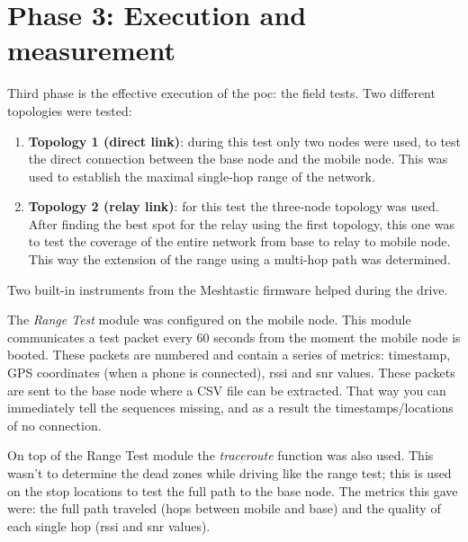\section{Phase 3: Execution and measurement}%
\label{sec:method-measurement}

Third phase is the effective execution of the \gls{poc}: the field tests.
Two different topologies were tested:
\begin{enumerate}
  \item \textbf{Topology 1 (direct link)}: during this test only two nodes were used, to test the direct connection between the base
  node and the mobile node. This was used to establish the maximal single-hop range of the network.
  \item \textbf{Topology 2 (relay link)}: for this test the three-node topology was used. After finding the best spot for the relay
  using the first topology, this one was to test the coverage of the entire network from base to relay to mobile node.
  This way the extension of the range using a multi-hop path was determined.
\end{enumerate}

Two built-in instruments from the Meshtastic firmware helped during the drive.

The \emph{Range Test} module was configured on the mobile node. This module communicates a test packet every 60 seconds from the moment the mobile node is booted.
These packets are numbered and contain a series of metrics: timestamp, GPS coordinates (when a phone is connected), \gls{rssi} and \gls{snr} values. These packets
are sent to the base node where a CSV file can be extracted. That way you can immediately tell the sequences missing, and as a result the timestamps/locations of no connection.

On top of the Range Test module the \emph{traceroute} function was also used. This wasn't to determine the dead zones while driving like the range test; this is used on the stop locations to test the full path to the base node.
The metrics this gave were: the full path traveled (hops between mobile and base) and the quality of each single hop (\gls{rssi} and \gls{snr} values).


